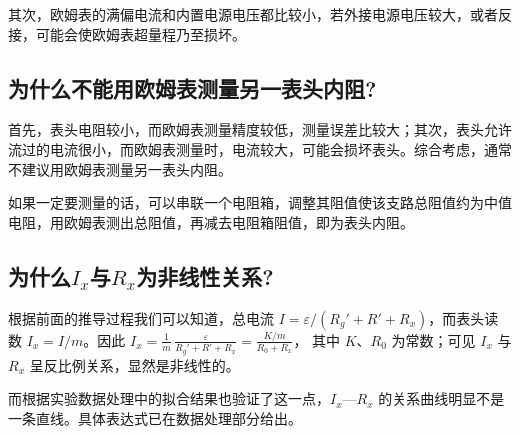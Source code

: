 \documentclass[]{../../templates/Report}%
\begin{document}
\begin{fullreportonly}
    其次，欧姆表的满偏电流和内置电源电压都比较小，若外接电源电压较大，或者反接，可能会使欧姆表超量程乃至损坏。
    \subsection{为什么不能用欧姆表测量另一表头内阻?}

    首先，表头电阻较小，而欧姆表测量精度较低，测量误差比较大；其次，表头允许流过的电流很小，而欧姆表测量时，电流较大，可能会损坏表头。综合考虑，通常不建议用欧姆表测量另一表头内阻。

    如果一定要测量的话，可以串联一个电阻箱，调整其阻值使该支路总阻值约为中值电阻，用欧姆表测出总阻值，再减去电阻箱阻值，即为表头内阻。

    \subsection{为什么$I_x$与$R_x$为非线性关系?}
    根据前面的推导过程我们可以知道，总电流 $I=\varepsilon/(R_g'+R'+R_x)$，而表头读数 $I_x=I/m$。因此
    $I_x = \frac{1}{m}\,\frac{\varepsilon}{R_g' + R' + R_x} = \frac{K/m}{R_0+R_x}$，
    其中 $K$、$R_0$ 为常数；可见 $I_x$ 与 $R_x$ 呈反比例关系，显然是非线性的。

    而根据实验数据处理中的拟合结果也验证了这一点，$I_x$—$R_x$ 的关系曲线明显不是一条直线。具体表达式已在数据处理部分给出。
\end{fullreportonly}
\insertnotes
\end{document}
